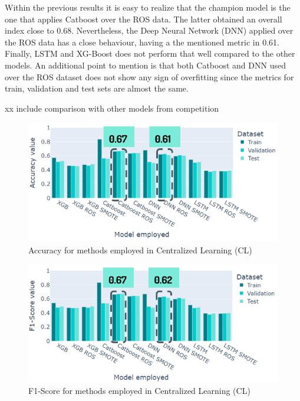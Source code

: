 Within the previous results it is easy to realize that the champion model is the one that applies Catboost over the ROS data. The latter obtained an overall index close to 0.68. Nevertheless, the Deep Neural Network (DNN) applied over the ROS data has a close behaviour, having a the mentioned metric in 0.61. Finally, LSTM and XG-Boost does not perform that well compared to the other models. An additional point to mention is that both Catboost and DNN used over the ROS dataset does not show any sign of overfitting since the metrics for train, validation and test sets are almost the same.

xx include comparison with other models from competition

\begin{figure}[H]
\centering
\includegraphics[scale=0.7]{img/cl_accuracy_methods.PNG}
\caption{Accuracy for methods employed in Centralized Learning (CL)}
\label{fig:cl_accuracy_methods}
\end{figure}

\begin{figure}[H]
\centering
\includegraphics[scale=0.7]{img/cl_f1score_methods.PNG}
\caption{F1-Score for methods employed in Centralized Learning (CL)}
\label{fig:cl_f1score_methods}
\end{figure}

